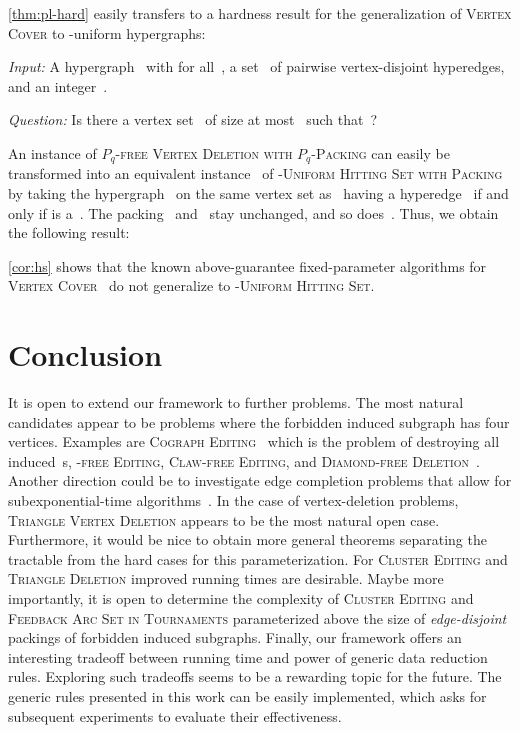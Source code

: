 \documentclass[envcountsame,numbook,smallextended]{svjour3}
\newcommand{\shorten}[1]{}
\numberwithin{equation}{section}
\numberwithin{figure}{section}
\newcommand{\decprob}[3]{\pagebreak[3]
  \begin{problem}[\boldmath#1]
    \begin{compactdesc}
        \item[\normalfont\it Input:] #2
        \item[\normalfont\it Question:] #3
    \end{compactdesc}
  \end{problem}
}
\newcommand{\PLVD}{\textsc{\ensuremath{P_q}-free Vertex Deletion with  \ensuremath{P_q}-Packing}}
\begin{document}
\noindent \cref{thm:pl-hard} easily transfers to a hardness result for the generalization of \textsc{Vertex Cover} to -uniform hypergraphs:

\decprob{\boldmath-\textsc{Uniform Hitting
    Set with Packing}} {A hypergraph~ with  for
  all~, a set~ of pairwise
  vertex-disjoint hyperedges, and an integer~.}{Is there a vertex
  set~ of size at most~ such that~?}

\noindent An instance  of \PLVD{} can easily be transformed into an equivalent instance~ of -\textsc{Uniform Hitting Set with Packing} by taking the hypergraph~ on the same vertex set as~ having a hyperedge~ if and only if  is a~.  The packing~ and~ stay unchanged, and so does~.  Thus, we obtain the following result:

  
\noindent \cref{cor:hs} shows that the known above-guarantee fixed-parameter algorithms for \textsc{Vertex Cover}~\cite{RO09,CPPW13,LNR+14,GP15} do not generalize to -\textsc{Uniform Hitting Set}.

\section{Conclusion}
\label{sec:conclusion}
It is open to extend our framework to further problems. The
most natural candidates appear to be problems where the forbidden induced subgraph has four vertices. Examples are \textsc{Cograph Editing}~\cite{LWGC12} which is
the problem of destroying all induced~s, \textsc{-free
  Editing}, \textsc{Claw-free Editing}, and \textsc{Diamond-free Deletion}~\cite{FGKNU11,SS15}. Another direction could be to investigate edge completion problems that allow for subexponential-time algorithms~\cite{DFPV15}. In the case of
vertex-deletion problems, \textsc{Triangle Vertex Deletion} appears to
be the most natural open case. Furthermore, it would be nice to obtain
more general theorems separating the tractable from the hard cases for
this parameterization.
For \textsc{Cluster Editing} and \textsc{Triangle Deletion} improved
running times \shorten{by better search trees} are desirable. Maybe more
importantly, it is open to determine the complexity of \textsc{Cluster
  Editing} and \textsc{Feedback Arc Set in Tournaments} parameterized
above the size of \emph{edge-disjoint} packings of forbidden
induced subgraphs.
Finally,  our framework offers an interesting tradeoff between
running time and power of generic data reduction rules. Exploring such
tradeoffs seems to be a rewarding topic for the future. The generic
rules presented in this work can be easily implemented, which asks for
subsequent experiments to evaluate their effectiveness.


\end{document}
